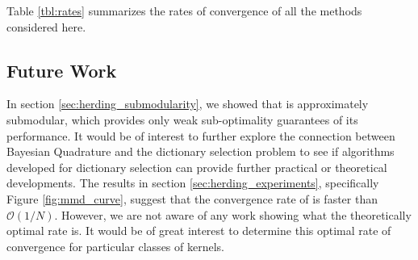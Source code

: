 Table \ref{tbl:rates} summarizes the rates of convergence of all the methods considered here.

\subsection{Future Work}

In section \ref{sec:herding_submodularity}, we showed that \sbq{} is approximately submodular, which provides only weak sub-optimality guarantees of its performance. It would be of interest to further explore the connection between Bayesian Quadrature and the dictionary selection problem to see if algorithms developed for dictionary selection can provide further practical or theoretical developments. The results in section \ref{sec:herding_experiments}, specifically Figure \ref{fig:mmd_curve}, suggest that the convergence rate of \sbq{} is faster than $\mathcal{O}(1/N)$. However, we are not aware of any work showing what the theoretically optimal rate is. It would be of great interest to determine this optimal rate of convergence for particular classes of kernels.